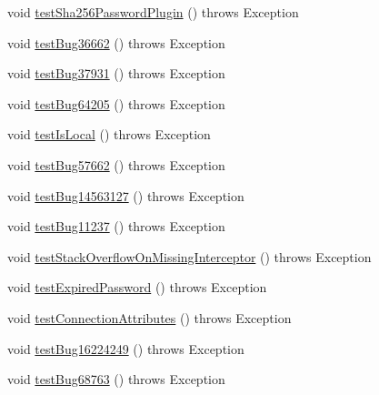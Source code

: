 \begin{DoxyCompactItemize}
void \mbox{\hyperlink{classtestsuite_1_1regression_1_1_connection_regression_test_a40ea24784903b1b96d51638e255bce89}{test\+Sha256\+Password\+Plugin}} ()  throws Exception 
\item 
void \mbox{\hyperlink{classtestsuite_1_1regression_1_1_connection_regression_test_a4a852ef727df5cbf2edb3101777242eb}{test\+Bug36662}} ()  throws Exception 
\item 
void \mbox{\hyperlink{classtestsuite_1_1regression_1_1_connection_regression_test_ada07910203fe2c828a532315e7af78f2}{test\+Bug37931}} ()  throws Exception 
\item 
void \mbox{\hyperlink{classtestsuite_1_1regression_1_1_connection_regression_test_a8fa364e429ee030b12ef947afda51f3b}{test\+Bug64205}} ()  throws Exception 
\item 
void \mbox{\hyperlink{classtestsuite_1_1regression_1_1_connection_regression_test_a1cf7d5151c9a43346621a107c14d37a3}{test\+Is\+Local}} ()  throws Exception 
\item 
void \mbox{\hyperlink{classtestsuite_1_1regression_1_1_connection_regression_test_a17f3b11b2a832994194387aa1ebc110e}{test\+Bug57662}} ()  throws Exception 
\item 
void \mbox{\hyperlink{classtestsuite_1_1regression_1_1_connection_regression_test_ab777c77610ca0c68d9187a864602adba}{test\+Bug14563127}} ()  throws Exception 
\item 
void \mbox{\hyperlink{classtestsuite_1_1regression_1_1_connection_regression_test_a93fc4be2d20938ec5b54e34d3c2eb25c}{test\+Bug11237}} ()  throws Exception 
\item 
void \mbox{\hyperlink{classtestsuite_1_1regression_1_1_connection_regression_test_ae8df976277a98a5f56b0fc591a4f6103}{test\+Stack\+Overflow\+On\+Missing\+Interceptor}} ()  throws Exception 
\item 
void \mbox{\hyperlink{classtestsuite_1_1regression_1_1_connection_regression_test_a8e581b7d593b06e2deca5f2498c3de72}{test\+Expired\+Password}} ()  throws Exception 
\item 
void \mbox{\hyperlink{classtestsuite_1_1regression_1_1_connection_regression_test_ab031515e8ccff3b5b929eccb92f9ca64}{test\+Connection\+Attributes}} ()  throws Exception 
\item 
void \mbox{\hyperlink{classtestsuite_1_1regression_1_1_connection_regression_test_a24c8f315d33aa8259b7777c43e225b24}{test\+Bug16224249}} ()  throws Exception 
\item 
void \mbox{\hyperlink{classtestsuite_1_1regression_1_1_connection_regression_test_ad20cb3d4d184371c5cbf7e540726e6a6}{test\+Bug68763}} ()  throws Exception 

\end{DoxyCompactItemize}
